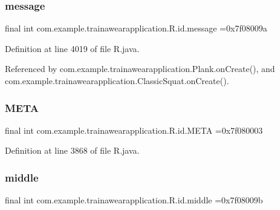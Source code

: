 \subsubsection{\texorpdfstring{message}{message}}
{\footnotesize\ttfamily final int com.\+example.\+trainawearapplication.\+R.\+id.\+message =0x7f08009a\hspace{0.3cm}{\ttfamily [static]}}



Definition at line 4019 of file R.\+java.



Referenced by com.\+example.\+trainawearapplication.\+Plank.\+on\+Create(), and com.\+example.\+trainawearapplication.\+Classic\+Squat.\+on\+Create().

\mbox{\label{classcom_1_1example_1_1trainawearapplication_1_1_r_1_1id_a40344700e81ce1250d67eb03772b472d}} 
\subsubsection{\texorpdfstring{META}{META}}
{\footnotesize\ttfamily final int com.\+example.\+trainawearapplication.\+R.\+id.\+M\+E\+TA =0x7f080003\hspace{0.3cm}{\ttfamily [static]}}



Definition at line 3868 of file R.\+java.

\mbox{\label{classcom_1_1example_1_1trainawearapplication_1_1_r_1_1id_a86689f130af73b24ca7c4fba28f1ea78}} 
\subsubsection{\texorpdfstring{middle}{middle}}
{\footnotesize\ttfamily final int com.\+example.\+trainawearapplication.\+R.\+id.\+middle =0x7f08009b\hspace{0.3cm}{\ttfamily [static]}}



